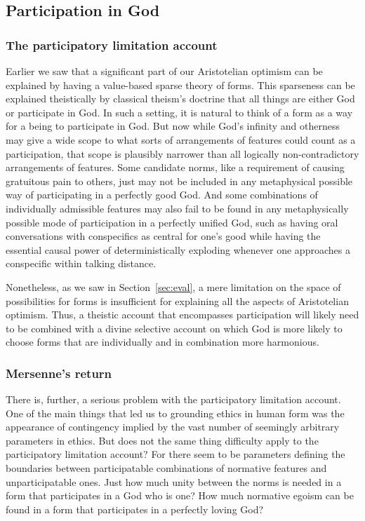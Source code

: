 \subsection{Participation in God}
\subsubsection{The participatory limitation account}
Earlier we saw that a significant part of our Aristotelian optimism can be explained by having a value-based sparse
theory of forms. This sparseness can be explained theistically by classical theism's doctrine 
that all things are either God or participate in God. In such a setting, it is natural to think of a form as a way for 
a being to participate in God. But now while God's infinity and otherness may give a wide scope to what sorts of
arrangements of features could count as a participation, that scope is plausibly narrower than all logically non-contradictory
arrangements of features. Some candidate norms, like a requirement of causing gratuitous pain to others, just may not be included 
in any metaphysical possible way of participating in a perfectly good God. And some combinations of individually admissible features may also 
fail to be found in any metaphysically possible mode of participation in a perfectly unified God, such as having oral conversations with 
conspecifics as central for one's good while having the essential causal power of deterministically exploding whenever one approaches a 
conspecific within talking distance. 

Nonetheless, as we saw in Section~\ref{sec:eval}, a mere limitation on the space of possibilities for forms is insufficient for explaining all the aspects of Aristotelian optimism. Thus, a theistic account that encompasses
participation will likely need to be combined with a divine selective account on which God is more likely to
choose forms that are individually and in combination more harmonious.

\subsubsection{Mersenne's return}\label{sec:limited-pl}
There is, further, a serious problem with the participatory limitation account. One of the main things that led us to grounding ethics
in human form was the appearance of contingency implied by the vast number of seemingly arbitrary parameters in ethics. But does not 
the same thing difficulty apply to the participatory limitation account? For there seem to be parameters defining the boundaries between
participatable combinations of normative features and unparticipatable ones. Just how much unity between the norms is needed in a form
that participates in a God who is one? How much normative egoism can be found in a form that participates in a perfectly loving God?


